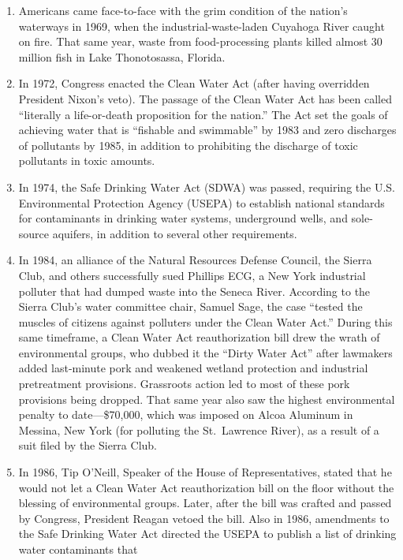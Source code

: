 \documentclass{article}
\begin{document}
\begin{enumerate}
\def\labelenumi{\arabic{enumi}.}
\item
  Americans came face-to-face with the grim condition of the nation's
  waterways in 1969, when the industrial-waste-laden Cuyahoga River
  caught on fire. That same year, waste from food-processing plants
  killed almost 30 million fish in Lake Thonotosassa, Florida.
\item
  In 1972, Congress enacted the Clean Water Act (after having overridden
  President Nixon's veto). The passage of the Clean Water Act has been
  called ``literally a life-or-death proposition for the nation.'' The
  Act set the goals of achieving water that is ``fishable and
  swimmable'' by 1983 and zero discharges of pollutants by 1985, in
  addition to prohibiting the discharge of toxic pollutants in toxic
  amounts.
\item
  In 1974, the Safe Drinking Water Act (SDWA) was passed, requiring the
  U.S. Environmental Protection Agency (USEPA) to establish national
  standards for contaminants in drinking water systems, underground
  wells, and sole-source aquifers, in addition to several other
  requirements.
\item
  In 1984, an alliance of the Natural Resources Defense Council, the
  Sierra Club, and others successfully sued Phillips ECG, a New York
  industrial polluter that had dumped waste into the Seneca River.
  According to the Sierra Club's water committee chair, Samuel Sage, the
  case ``tested the muscles of citizens against polluters under the
  Clean Water Act.'' During this same timeframe, a Clean Water Act
  reauthorization bill drew the wrath of environmental groups, who
  dubbed it the ``Dirty Water Act'' after lawmakers added last-minute
  pork and weakened wetland protection and industrial pretreatment
  provisions. Grassroots action led to most of these pork provisions
  being dropped. That same year also saw the highest environmental
  penalty to date---\$70,000, which was imposed on Alcoa Aluminum in
  Messina, New York (for polluting the St.~Lawrence River), as a result
  of a suit filed by the Sierra Club.
\item
  In 1986, Tip O'Neill, Speaker of the House of Representatives, stated
  that he would not let a Clean Water Act reauthorization bill on the
  floor without the blessing of environmental groups. Later, after the
  bill was crafted and passed by Congress, President Reagan vetoed the
  bill. Also in 1986, amendments to the Safe Drinking Water Act directed
  the USEPA to publish a list of drinking water contaminants that

\end{enumerate}
\end{document}
